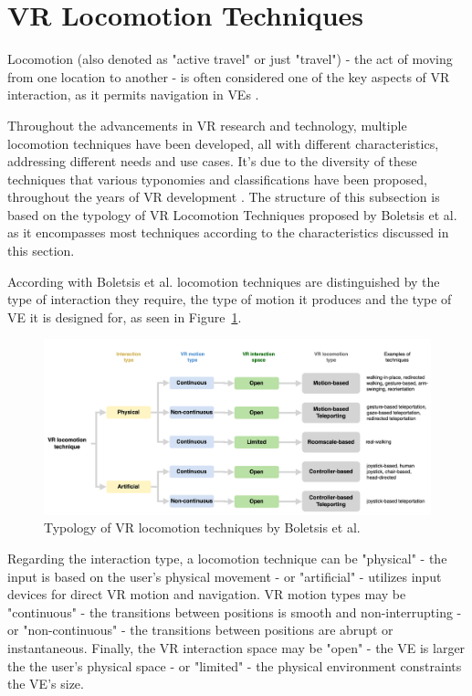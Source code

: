 \section{VR Locomotion Techniques}
\label{sec:vr-locomotion-techniques}

Locomotion (also denoted as "active travel" or just "travel"\cite{Langbehn2018}) - 
the act of moving from one location to another - is often considered one of the key aspects of \gls{VR} interaction\cite{8255772}, 
as it permits navigation in \glspl{VE} \cite{Boletsis2019}.

Throughout the advancements in \gls{VR} research and technology, multiple locomotion techniques have been developed, 
all with different characteristics, addressing different needs and use cases\cite{Boletsis2022}. 
It's due to the diversity of these techniques that various typonomies and classifications have been proposed,
throughout the years of \gls{VR} development \cite{Boletsis2022}. 
The structure of this subsection is based on the typology of \gls{VR} Locomotion Techniques proposed by Boletsis et al. 
\cite{Boletsis2022} as it encompasses most techniques according to the characteristics discussed in this section.

According with Boletsis et al. \cite{Boletsis2022} locomotion techniques are distinguished by the type of interaction they require, 
the type of motion it produces and the type of \gls{VE} it is designed for, as seen in Figure~\ref{fig:vr-locomotion-typology}.

\begin{figure}[b]
    \centering
    \includegraphics[width=\textwidth]{NOVAthesisFiles/Images/papers/vr-locomotion-typology.png}
    \caption{Typology of \gls{VR} locomotion techniques by Boletsis et al.\cite{Boletsis2022}}
    \label{fig:vr-locomotion-typology}
\end{figure}

Regarding the interaction type, a locomotion technique can be "physical" - 
the input is based on the user's physical movement - or "artificial" - utilizes input devices for direct \gls{VR} motion and navigation.
\gls{VR} motion types may be "continuous" - the transitions between positions is smooth and non-interrupting - 
or "non-continuous" - the transitions between positions are abrupt or instantaneous.
Finally, the \gls{VR} interaction space may be "open" - the \gls{VE} is larger the the user's physical space - 
or "limited" - the physical environment constraints the \gls{VE}'s size.

